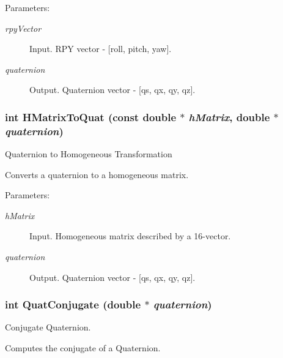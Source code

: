 \begin{Desc}
\item[Parameters:]
\begin{description}
\item[{\em rpyVector}]Input. RPY vector - \mbox{[}roll, pitch, yaw\mbox{]}. \item[{\em quaternion}]Output. Quaternion vector - \mbox{[}qs, qx, qy, qz\mbox{]}. \end{description}
\end{Desc}
\hypertarget{group__quaternion_gb7f636ec0cec733d2511ca8b27c72ded}{
\subsubsection[HMatrixToQuat]{\setlength{\rightskip}{0pt plus 5cm}int HMatrixToQuat (const double $\ast$ {\em hMatrix}, \/  double $\ast$ {\em quaternion})}}
\label{group__quaternion_gb7f636ec0cec733d2511ca8b27c72ded}


Quaternion to Homogeneous Transformation 

Converts a quaternion to a homogeneous matrix.

\begin{Desc}
\item[Parameters:]
\begin{description}
\item[{\em hMatrix}]Input. Homogeneous matrix described by a 16-vector. \item[{\em quaternion}]Output. Quaternion vector - \mbox{[}qs, qx, qy, qz\mbox{]}. \end{description}
\end{Desc}
\hypertarget{group__quaternion_gc2441656cae8e9ea1d3b1030559bfd80}{
\subsubsection[QuatConjugate]{\setlength{\rightskip}{0pt plus 5cm}int QuatConjugate (double $\ast$ {\em quaternion})}}
\label{group__quaternion_gc2441656cae8e9ea1d3b1030559bfd80}


Conjugate Quaternion. 

Computes the conjugate of a Quaternion.

